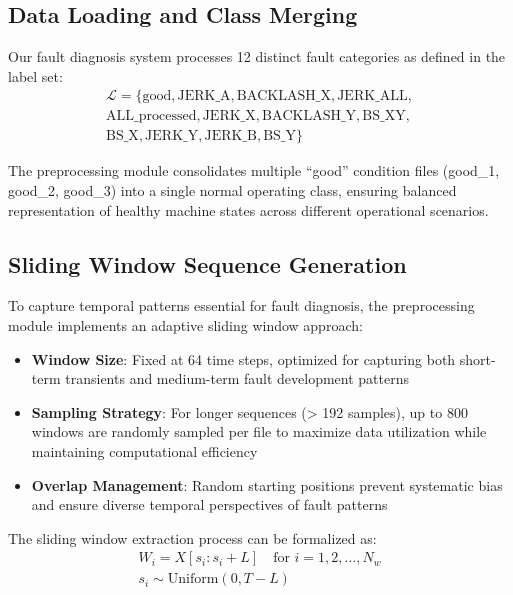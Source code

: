 \subsection{Data Loading and Class Merging}
\label{subsec:data_loading}

Our fault diagnosis system processes 12 distinct fault categories as defined in the label set:
\begin{align}
\mathcal{L} = \{\text{good}, \text{JERK\_A}, \text{BACKLASH\_X}, \text{JERK\_ALL}, \nonumber \\
\text{ALL\_processed}, \text{JERK\_X}, \text{BACKLASH\_Y}, \text{BS\_XY}, \nonumber \\
\text{BS\_X}, \text{JERK\_Y}, \text{JERK\_B}, \text{BS\_Y}\}
\end{align}

The preprocessing module consolidates multiple ``good'' condition files (good\_1, good\_2, good\_3) into a single normal operating class, ensuring balanced representation of healthy machine states across different operational scenarios.

\subsection{Sliding Window Sequence Generation}
\label{subsec:sliding_window}

To capture temporal patterns essential for fault diagnosis, the preprocessing module implements an adaptive sliding window approach:

\begin{itemize}
    \item \textbf{Window Size}: Fixed at 64 time steps, optimized for capturing both short-term transients and medium-term fault development patterns
    \item \textbf{Sampling Strategy}: For longer sequences (> 192 samples), up to 800 windows are randomly sampled per file to maximize data utilization while maintaining computational efficiency
    \item \textbf{Overlap Management}: Random starting positions prevent systematic bias and ensure diverse temporal perspectives of fault patterns
\end{itemize}

The sliding window extraction process can be formalized as:
\begin{align}
W_i = X[s_i : s_i + L] \quad \text{for } i = 1, 2, \ldots, N_w \\
s_i \sim \text{Uniform}(0, T - L)
\end{align}

